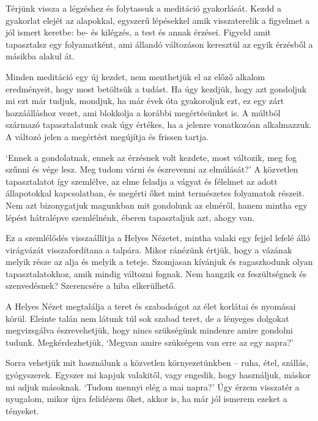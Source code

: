 
\noindent Térjünk vissza a légzéshez és folytassuk a meditáció
gyakorlását. Kezdd a gyakorlat elejét az alapokkal, egyszerű lépésekkel
amik visszaterelik a figyelmet a jól ismert keretbe: be- és kilégzés, a
test és annak érzései. Figyeld amit tapasztalsz egy folyamatként, ami
állandó változáson keresztül az egyik érzésből a másikba alakul át.

Minden meditáció egy új kezdet, nem menthetjük el az előző alkalom
eredményeit, hogy most betöltsük a tudást. Ha úgy kezdjük, hogy azt
gondoljuk mi ezt már tudjuk, mondjuk, ha már évek óta gyakoroljuk ezt,
ez egy zárt hozzáálláshoz vezet, ami blokkolja a korábbi megértésünket
is. A múltból származó tapasztalatunk csak úgy értékes, ha a jelenre
vonatkozóan alkalmazzuk. A változó jelen a megértést megújítja és
frissen tartja.

`Ennek a gondolatnak, ennek az érzésnek volt kezdete, most változik, meg
fog szűnni és vége lesz. Meg tudom várni és észrevenni az elmúlását?' A
közvetlen tapasztalatot így szemlélve, az elme feladja a vágyat és
félelmet az adott állapotokkal kapcsolatban, és megérti őket mint
természetes folyamatok részeit. Nem azt bizonygatjuk magunkban mit
gondolunk az elméről, hanem mintha egy lépést hátralépve szemlélnénk,
éberen tapasztaljuk azt, ahogy van.

Ez a szemlélődés visszaállítja a Helyes Nézetet, mintha valaki egy
fejjel lefelé álló virágvázát visszafordítana a talpára. Mikor ránézünk
értjük, hogy a vázának melyik része az alja és melyik a teteje.
Szomjasan kívánjuk és ragaszkodunk olyan tapasztalatokhoz, amik mindig
változni fognak. Nem hangzik ez feszültségnek és szenvedésnek?
Szerencsére a hiba elkerülhető.


A Helyes Nézet megtalálja a teret és szabadságot az élet korlátai és
nyomásai körül. Eleinte talán nem látunk túl sok szabad teret, de a
lényeges dolgokat megvizsgálva észrevehetjük, hogy nincs szükségünk
mindenre amire gondolni tudunk. Megkérdezhetjük, `Megvan amire szükségem
van erre az egy napra?'

Sorra vehetjük mit használunk a közvetlen környezetünkben -- ruha, étel,
szállás, gyógyszerek. Egyszer mi kapjuk valakitől, vagy engedik, hogy
használjuk, máskor mi adjuk másoknak. `Tudom mennyi elég a mai napra?'
Úgy érzem visszatér a nyugalom, mikor újra felidézem őket, akkor is,
ha már jól ismerem ezeket a tényeket.

